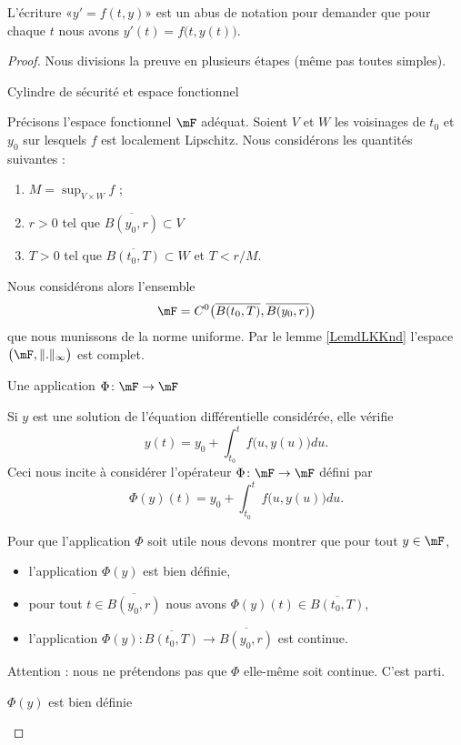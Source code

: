 \begin{remark}
    L'écriture «\( y'=f(t,y)\)» est un abus de notation pour demander que pour chaque \( t\) nous avons \( y'(t)=f\big(t,y(t)\big)\).
\end{remark}

\begin{proof}
    Nous divisions la preuve en plusieurs étapes (même pas toutes simples).
    \begin{subproof}
    \item[Cylindre de sécurité et espace fonctionnel]

    Précisons l'espace fonctionnel \( \mF\) adéquat. Soient \( V\) et \( W\) les voisinages de \( t_0\) et \( y_0\) sur lesquels \( f\) est localement Lipschitz. Nous considérons les quantités suivantes :
    \begin{enumerate}
        \item
            \( M=\sup_{V\times W}f\) ;
        \item
            \( r>0\) tel que \( \overline{ B(y_0,r) }\subset V\)
        \item
            \( T>0\) tel que \( \overline{ B(t_0,T) }\subset W\) et \( T<r/M\).
    \end{enumerate}
    Nous considérons alors l'ensemble
    \begin{equation}
        \mF=C^0\big( \overline{ B(t_0,T) },\overline{ B(y_0,r) } \big)
    \end{equation}
    que nous munissons de la norme uniforme. Par le lemme \ref{LemdLKKnd} l'espace \( \big( \mF,\| . \|_{\infty} \big)\) est complet.

    \item[Une application \( \Phi\colon \mF\to \mF\)]


    Si \( y\) est une solution de l'équation différentielle considérée, elle vérifie
    \begin{equation}        \label{EqPGLwcL}
        y(t)=y_0+\int_{t_0}^tf\big( u,y(u) \big)du.
    \end{equation}
    Ceci nous incite à considérer l'opérateur \( \Phi\colon \mF\to \mF\) défini par
    \begin{equation}
        \Phi(y)(t)=y_0+\int_{t_0}^tf\big( u,y(u) \big)du.
    \end{equation}

    Pour que l'application \( \Phi\) soit utile nous devons montrer que pour tout \( y\in \mF\),
    \begin{itemize}
        \item l'application \( \Phi(y)\) est bien définie,
        \item pour tout \( t\in\overline{ B(y_0,r) }\) nous avons \( \Phi(y)(t)\in\overline{ B(t_0,T) }\),
        \item l'application $\Phi(y)\colon    \overline{ B(t_0,T) }\to \overline{ B(y_0,r)} $ est continue.
    \end{itemize}
    Attention : nous ne prétendons pas que \( \Phi\) elle-même soit continue. C'est parti.
    \begin{subproof}
    \item[\( \Phi(y)\) est bien définie]
            

\end{subproof}
\end{subproof}
\end{proof}
